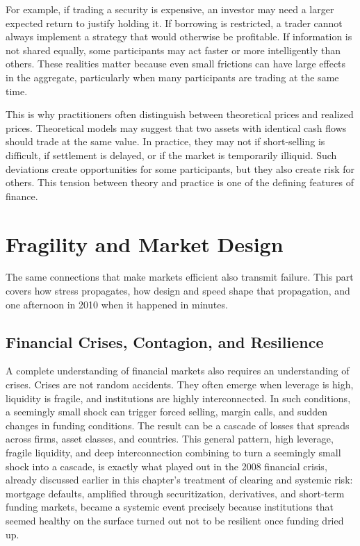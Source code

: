 \documentclass[../ai_in_finance]{subfiles}
\begin{document}
For example, if trading a security is expensive, an investor may need a larger expected return to justify holding it. If borrowing is restricted, a trader cannot always implement a strategy that would otherwise be profitable. If information is not shared equally, some participants may act faster or more intelligently than others. These realities matter because even small frictions can have large effects in the aggregate, particularly when many participants are trading at the same time.

This is why practitioners often distinguish between theoretical prices and realized prices. Theoretical models may suggest that two assets with identical cash flows should trade at the same value. In practice, they may not if short-selling is difficult, if settlement is delayed, or if the market is temporarily illiquid. Such deviations create opportunities for some participants, but they also create risk for others. This tension between theory and practice is one of the defining features of finance.

\section{Fragility and Market Design}

The same connections that make markets efficient also transmit failure. This part covers how stress propagates, how design and speed shape that propagation, and one afternoon in 2010 when it happened in minutes.

\subsection{Financial Crises, Contagion, and Resilience}

A complete understanding of financial markets also requires an understanding of crises. Crises are not random accidents. They often emerge when leverage is high, liquidity is fragile, and institutions are highly interconnected. In such conditions, a seemingly small shock can trigger forced selling, margin calls, and sudden changes in funding conditions. The result can be a cascade of losses that spreads across firms, asset classes, and countries.
This general pattern, high leverage, fragile liquidity, and deep interconnection combining to turn a seemingly small shock into a cascade, is exactly what played out in the 2008 financial crisis, already discussed earlier in this chapter's treatment of clearing and systemic risk: mortgage defaults, amplified through securitization, derivatives, and short-term funding markets, became a systemic event precisely because institutions that seemed healthy on the surface turned out not to be resilient once funding dried up.
\end{document}
